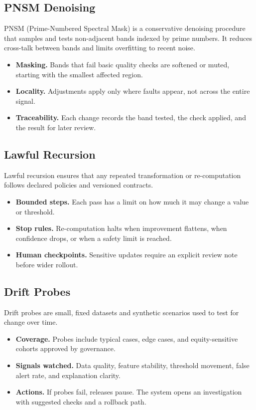 \documentclass[12pt]{article}
\begin{document}
\subsection*{PNSM Denoising}
PNSM (Prime-Numbered Spectral Mask) is a conservative denoising procedure that samples and tests non-adjacent bands indexed by prime numbers. It reduces cross-talk between bands and limits overfitting to recent noise.
\begin{itemize}[leftmargin=*]
  \item \textbf{Masking.} Bands that fail basic quality checks are softened or muted, starting with the smallest affected region.
  \item \textbf{Locality.} Adjustments apply only where faults appear, not across the entire signal.
  \item \textbf{Traceability.} Each change records the band tested, the check applied, and the result for later review.
\end{itemize}

\subsection*{Lawful Recursion}
Lawful recursion ensures that any repeated transformation or re-computation follows declared policies and versioned contracts.
\begin{itemize}[leftmargin=*]
  \item \textbf{Bounded steps.} Each pass has a limit on how much it may change a value or threshold.
  \item \textbf{Stop rules.} Re-computation halts when improvement flattens, when confidence drops, or when a safety limit is reached.
  \item \textbf{Human checkpoints.} Sensitive updates require an explicit review note before wider rollout.
\end{itemize}

\subsection*{Drift Probes}
Drift probes are small, fixed datasets and synthetic scenarios used to test for change over time.
\begin{itemize}[leftmargin=*]
  \item \textbf{Coverage.} Probes include typical cases, edge cases, and equity-sensitive cohorts approved by governance.
  \item \textbf{Signals watched.} Data quality, feature stability, threshold movement, false alert rate, and explanation clarity.
  \item \textbf{Actions.} If probes fail, releases pause. The system opens an investigation with suggested checks and a rollback path.
\end{itemize}
\end{document}
